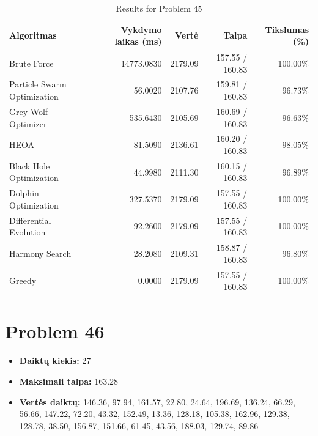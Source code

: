 \documentclass[a4paper,11pt]{article}
\begin{document}
\begin{table}[h!]
\centering
\begin{tabular}{lrrrr}
\toprule
\textbf{Algoritmas} & \textbf{Vykdymo laikas (ms)} & \textbf{Vertė} & \textbf{Talpa} & \textbf{Tikslumas (\%)} \\
\midrule
Brute Force & 14773.0830 & 2179.09 & 157.55 / 160.83 & 100.00\% \\
Particle Swarm Optimization & 56.0020 & 2107.76 & 159.81 / 160.83 & 96.73\% \\
Grey Wolf Optimizer & 535.6430 & 2105.69 & 160.69 / 160.83 & 96.63\% \\
HEOA & 81.5090 & 2136.61 & 160.20 / 160.83 & 98.05\% \\
Black Hole Optimization & 44.9980 & 2111.30 & 160.15 / 160.83 & 96.89\% \\
Dolphin Optimization & 327.5370 & 2179.09 & 157.55 / 160.83 & 100.00\% \\
Differential Evolution & 92.2600 & 2179.09 & 157.55 / 160.83 & 100.00\% \\
Harmony Search & 28.2080 & 2109.31 & 158.87 / 160.83 & 96.80\% \\
Greedy & 0.0000 & 2179.09 & 157.55 / 160.83 & 100.00\% \\
\bottomrule
\end{tabular}
\caption{Results for Problem 45}
\end{table}
\clearpage

\section*{Problem 46}
\begin{itemize}
    \item \textbf{Daiktų kiekis:} 27
    \item \textbf{Maksimali talpa:} 163.28
    \item \textbf{Vertės daiktų:} 146.36, 97.94, 161.57, 22.80, 24.64, 196.69, 136.24, 66.29, 56.66, 147.22, 72.20, 43.32, 152.49, 13.36, 128.18, 105.38, 162.96, 129.38, 128.78, 38.50, 156.87, 151.66, 61.45, 43.56, 188.03, 129.74, 89.86
\end{itemize}
\end{document}
